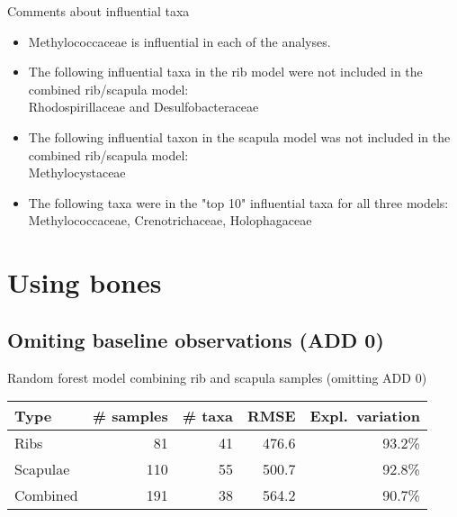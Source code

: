 \documentclass{beamer}
\begin{document}
\begin{frame}{Comments about influential taxa}

  \begin{itemize}
    \item Methylococcaceae is influential in each of the analyses.
    \item The following influential taxa in the rib model were not included in
    the combined rib/scapula model:\\
    Rhodospirillaceae and Desulfobacteraceae
    \item The following influential taxon in the scapula model was not included
    in the combined rib/scapula model:\\
    Methylocystaceae
    \item The following taxa were in the "top 10" influential taxa for all
    three models:\\
    Methylococcaceae, Crenotrichaceae, Holophagaceae
  \end{itemize}

\end{frame}





\section{Using bones}


\subsection{Omiting baseline observations (ADD 0)}

\begin{frame}{Random forest model combining rib and scapula samples (omitting ADD 0)}

  \begin{tabular}{lrrrr}
    Type & \# samples & \# taxa & RMSE & Expl.\ variation\\ \hline
    Ribs & 81 & 41 & 476.6 & 93.2\% \\
    Scapulae & 110 & 55 & 500.7 &  92.8\% \\
    Combined & 191 & 38 & 564.2 & 90.7\%
  \end{tabular}
  
  \vspace{0.1in}

\end{frame}
\end{document}
